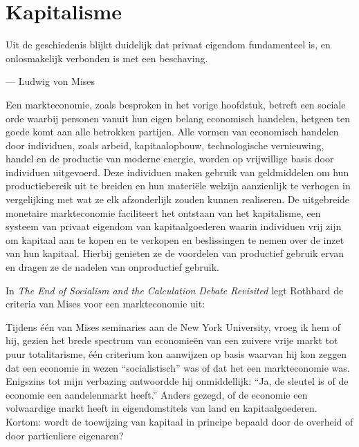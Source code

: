 \hypertarget{kapitalisme}{%
\chapter{Kapitalisme}\label{kapitalisme}}

\vspace{1em}
\begin{blockquotebox}
    Uit de geschiedenis blijkt duidelijk dat privaat eigendom fundamenteel is, en onlosmakelijk verbonden is met een beschaving.\footnotemark
    \par\raggedleft--- Ludwig von Mises    
\end{blockquotebox}

\vspace{2em}

Een markteconomie, zoals besproken in het vorige hoofdstuk, betreft een sociale orde waarbij personen vanuit hun eigen belang economisch handelen, hetgeen ten goede komt aan alle betrokken partijen. Alle vormen van economisch handelen door individuen, zoals arbeid, kapitaalopbouw, technologische vernieuwing, handel en de productie van moderne energie, worden op vrijwillige basis door individuen uitgevoerd. Deze individuen maken gebruik van geldmiddelen om hun productiebereik uit te breiden en hun materiële welzijn aanzienlijk te verhogen in vergelijking met wat ze elk afzonderlijk zouden kunnen realiseren. De uitgebreide monetaire markteconomie faciliteert het ontstaan van het kapitalisme, een systeem van privaat eigendom van kapitaalgoederen waarin individuen vrij zijn om kapitaal aan te kopen en te verkopen en beslissingen te nemen over de inzet van hun kapitaal. Hierbij genieten ze de voordelen van productief gebruik ervan en dragen ze de nadelen van onproductief gebruik.

\clearpage

In \emph{The End of Socialism and the Calculation Debate Revisited} legt Rothbard de criteria van Mises voor een markteconomie uit:

\begin{blockquotebox}
    Tijdens één van Mises\textquotesingle{} seminaries aan de New York University, vroeg ik hem of hij, gezien het brede spectrum van economieën van een zuivere vrije markt tot puur totalitarisme, één criterium kon aanwijzen op basis waarvan hij kon zeggen dat een economie in wezen ``socialistisch'' was of dat het een markteconomie was. Enigszins tot mijn verbazing antwoordde hij onmiddellijk: ``Ja, de sleutel is of de economie een aandelenmarkt heeft.'' Anders gezegd, of de economie een volwaardige markt heeft in eigendomstitels van land en kapitaalgoederen. Kortom: wordt de toewijzing van kapitaal in principe bepaald door de overheid of door particuliere eigenaren?\footnotemark
\end{blockquotebox}

